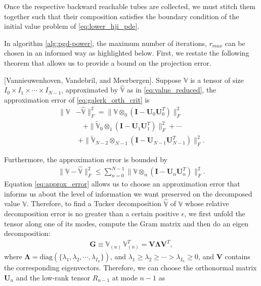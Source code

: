 Once the respective backward reachable tubes are collected, we must stitch them together such that their composition satisfies the boundary condition of the initial value problem of \eqref{eq:lower_hji_pde}. 

In algorithm \ref{alg:pgd-power}, the maximum number of iterations, $r_{max}$ can be chosen in an informed way as highlighted below. First, we restate the following theorem  that allows us to provide a bound on the projection error.
%
\begin{theorem}{[Vannieuwenhoven, Vandebril, and Meerbergen]}\cite[Th. 5.1]{VannieuwenhovenTruncate2012}. 
	Suppose $\mathds{V}$ is a tensor of size $I_0 \times I_1 \times \cdots \times I_{N-1}$, approximated by $\mathds{\hat{V}}$ as in \eqref{eq:value_reduced}, the approximation error of \eqref{eq:galerk_orth_crit} is 
	\begin{align}
		\|\mathds{V} &- \mathds{\hat{V}} \|^2_F = \| \mathds{V} \otimes_0 \left( \mathbf{I} - \mathbf{U}_0 \mathbf{U}_0^T \right)\|_F^2 \nonumber \\
		& \quad + \| \mathds{\tilde{V}}_0 \otimes_1 \left( \mathbf{I} - \mathbf{U}_1 \mathbf{U}_1^T \right)\|_F^2 + \cdots\nonumber \\
		& \,\,    + \| \mathds{\tilde{V}}_{N-2} \otimes_{N-1} \left( \mathbf{I} - \mathbf{U}_{N-1} \mathbf{U}_{N-1}^T \right)\|_F^2.
	\end{align}
	\label{theorem:hosvd}
\end{theorem}
%
Furthermore, the approximation error is bounded by 
%
\begin{align}
	\| \mathds{V} - \mathds{\hat{V}} \|_F^2 \le \sum_{n = 0}^{N-1} \| \mathds{V} \otimes_n \left(\mathbf{I} - \mathbf{U}_n \mathbf{U}_n^T\right)\|_F^2.
	\label{eq:approx_error}
\end{align}
%
Equation \eqref{eq:approx_error} allows us to choose an approximation error that informs us about the level of information we want preserved on the decomposed value $\mathds{V}$. Therefore, to  find a Tucker decomposition $\mathds{\hat{V}}$ of $\mathds{V}$ whose relative decomposition error is no greater than a certain positive $\epsilon$, we first unfold the tensor along one of its modes, compute the Gram matrix and then do an eigen decomposition:
%
\begin{align}
	\mathbf{G} \equiv \mathds{V}_{(n)} \, \mathds{V}_{(n)}^T = \mathbf{V} \mathbf{\Lambda} \mathbf{V}^T,
\end{align}
%
where $\mathbf{\Lambda} = \text{diag}\left(\{\lambda_1, \lambda_2, \cdots, \lambda_{I_n}\}\right)$, and $\lambda_1 \ge \lambda_2 \ge \cdots > \lambda_{I_n} \ge 0$, and $\mathbf{V}$ contains the corresponding eigenvectors. Therefore, we can choose the orthonormal matrix $\mathbf{U}_n$ and the low-rank tensor  $R_{n-1}$ at mode $n-1$ as 

